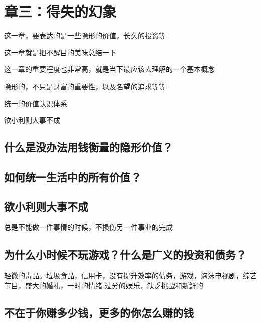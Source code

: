\chapter{章三：得失的幻象}

这一章，要表达的是一些隐形的价值，长久的投资等

这一章就是把不醒目的美味总结一下

这一章的重要程度也非常高，就是当下最应该去理解的一个基本概念

隐形的，不只是财富的重要性，以及名望的追求等等

统一的价值认识体系

欲小利则大事不成

\section{什么是没办法用钱衡量的隐形价值？}
\section{如何统一生活中的所有价值？}
\section{欲小利则大事不成}
总是不能做一件事情的时候，不损伤另一件事业的完成
\section{为什么小时候不玩游戏？什么是广义的投资和债务？}
轻微的毒品。垃圾食品，信用卡，没有提升效率的债务，游戏，泡沫电视剧，综艺节目，盛大的婚礼，一时的情绪
过分的娱乐，缺乏挑战和新鲜的
\section{不在于你赚多少钱，更多的你怎么赚的钱}
